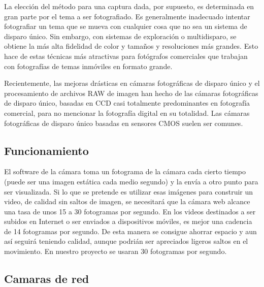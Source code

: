\documentclass[12pt,a4papert,woside,openright,titlepage,final]{book}
\begin{document}
La elección del método para una captura dada, por supuesto, es determinada en
gran parte por el tema a ser fotografiado. Es generalmente inadecuado intentar
fotografiar un tema que se mueva con cualquier cosa que no sea un sistema de
disparo único. Sin embargo, con sistemas de exploración o multidisparo, se
obtiene la más alta fidelidad de color y tamaños y resoluciones más grandes.
Esto hace de estas técnicas más atractivas para fotógrafos comerciales que
trabajan con fotografías de temas inmóviles en formato grande.

Recientemente, las mejoras drásticas en cámaras fotográficas de disparo único y
el procesamiento de archivos RAW de imagen han hecho de las cámaras fotográficas
de disparo único, basadas en CCD casi totalmente predominantes en fotografía
comercial, para no mencionar la fotografía digital en su totalidad. Las cámaras
fotográficas de disparo único basadas en sensores CMOS suelen ser comunes.

\subsection{Funcionamiento}

El software de la cámara toma un fotograma de la cámara cada cierto tiempo
(puede ser una imagen estática cada medio segundo) y la envía a otro punto para
ser visualizada. Si lo que se pretende es utilizar esas imágenes para construir
un video, de calidad sin saltos de imagen, se necesitará que la cámara web
alcance una tasa de unos 15 a 30 fotogramas por segundo.
En los videos destinados a ser subidos en Internet o ser enviados a dispositivos
móviles, es mejor una cadencia de 14 fotogramas por segundo. De esta manera se
consigue ahorrar espacio y aun así seguirá teniendo calidad, aunque podrián ser
apreciados ligeros saltos en el movimiento. En nuestro proyecto se usaran 30
fotogramas por segundo.

\subsection{Camaras de red}
\end{document}

